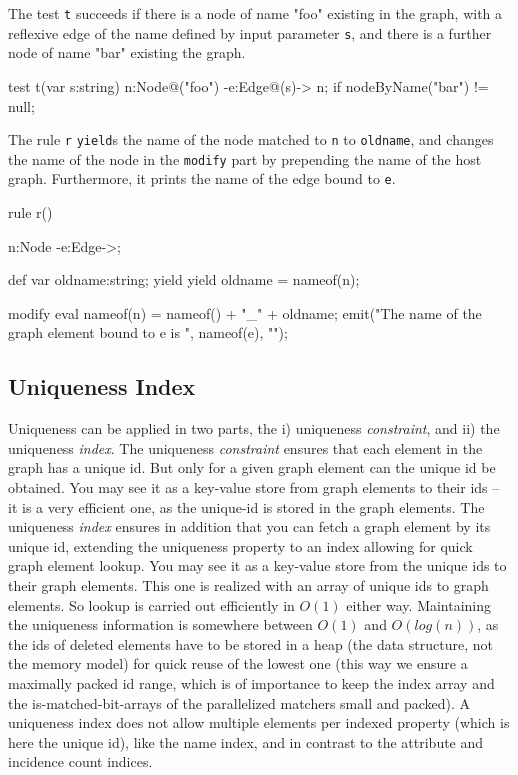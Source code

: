 \begin{example}
The test \texttt{t} succeeds if there is a node of name "foo" existing in the graph, with a reflexive edge of the name defined by input parameter \texttt{s}, and there is a further node of name "bar" existing the graph.

\begin{grgen}
test t(var s:string) {
  n:Node{@("foo")} -e:Edge{@(s)}-> n;
  if{ nodeByName("bar") != null; }
}
\end{grgen}

The rule \texttt{r} \texttt{yield}s the name of the node matched to \texttt{n} to \texttt{oldname}, and changes the name of the node in the \texttt{modify} part by prepending the name of the host graph. Furthermore, it prints the name of the edge bound to \texttt{e}.

\begin{grgen}
rule r() {
  n:Node -e:Edge->;

  def var oldname:string;
  yield { yield oldname = nameof(n); }
		
  modify {
    eval {
      nameof(n) = nameof() + "_" + oldname;
    }
    emit("The name of the graph element bound to e is ", nameof(e), "\n");
  }
}
\end{grgen}

\end{example}


\subsection{Uniqueness Index}\label{sec:uniqueness}
Uniqueness can be applied in two parts, the i) uniqueness \emph{constraint}, and ii) the uniqueness \emph{index}.
The uniqueness \emph{constraint} ensures that each element in the graph has a unique id. 
But only for a given graph element can the unique id be obtained.
You may see it as a key-value store from graph elements to their ids -- it is a very efficient one, as the unique-id is stored in the graph elements. 
The uniqueness \emph{index} ensures in addition that you can fetch a graph element by its unique id, extending the uniqueness property to an index allowing for quick graph element lookup.
You may see it as a key-value store from the unique ids to their graph elements.
This one is realized with an array of unique ids to graph elements.
So lookup is carried out efficiently in $O(1)$ either way.
Maintaining the uniqueness information is somewhere between $O(1)$ and $O(log(n))$, as the ids of deleted elements have to be stored in a heap (the data structure, not the memory model) for quick reuse of the lowest one (this way we ensure a maximally packed id range, which is of importance to keep the index array and the is-matched-bit-arrays of the parallelized matchers small and packed).
A uniqueness index does not allow multiple elements per indexed property (which is here the unique id), like the name index, and in contrast to the attribute and incidence count indices.

